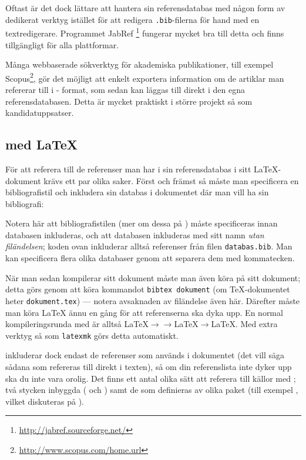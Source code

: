 \documentclass[lang=sv,ptsize=10pt,font=none,nomath,titles=bf,../../a4.tex]{subfiles}
\begin{document}
Oftast är det dock lättare att hantera sin referensdatabas med någon form
av dedikerat verktyg istället för att redigera \texttt{.bib}-filerna
för hand med en textredigerare. Programmet JabRef%
\footnote{\url{http://jabref.sourceforge.net/}}
fungerar mycket bra till detta och finns tillgängligt för alla
plattformar.

Många webbaserade sökverktyg för akademiska publikationer, till exempel
Scopus\footnote{\url{http://www.scopus.com/home.url}}, gör det möjligt att
enkelt exportera information om de artiklar man refererar till i \BibTeX-%
format, som sedan kan läggas till direkt i den egna referensdatabasen.
Detta är mycket praktiskt i större projekt så som kandidatuppsatser.

\subsection{\BibTeX{} med \LaTeX{}}
För att referera till de referenser man har i sin referensdatabas
i sitt \LaTeX-dokument krävs ett par olika saker. Först och främst så
måste man specificera en bibliografistil och inkludera sin
databas i dokumentet där man vill ha sin bibliografi:
\begin{latexcode}


\end{latexcode}
Notera här att bibliografistilen (mer om dessa på )
måste specificeras
innan databasen inkluderas, och att databasen inkluderas med sitt namn
\emph{utan filändelsen}; koden ovan inkluderar alltså referenser från
filen \texttt{databas.bib}. Man kan specificera flera olika databaser
genom att separera dem med kommatecken.

När man sedan kompilerar sitt dokument måste man även köra \BibTeX{} på
sitt dokument; detta görs genom att köra kommandot \texttt{bibtex 
dokument} (om \TeX-dokumentet heter \texttt{dokument.tex}) — notera
avsaknaden av filändelse även här. Därefter måste man köra \LaTeX{} ännu
en gång för att referenserna ska dyka upp. En normal kompileringsrunda
med \BibTeX{} är alltså \LaTeX$\to$\BibTeX$\to$\LaTeX$\to$\LaTeX. Med
extra verktyg så som \texttt{latexmk} görs detta automatiskt.

\BibTeX{} inkluderar dock endast de referenser som används i dokumentet
(det vill säga sådana som refereras till direkt i texten), så om din
referenslista inte dyker upp ska du inte vara orolig. Det finns ett antal
olika sätt att referera till källor med \BibTeX{}; två stycken inbyggda
( och ) samt de som definieras av olika paket (till
exempel , vilket diskuteras på ).
\end{document}
